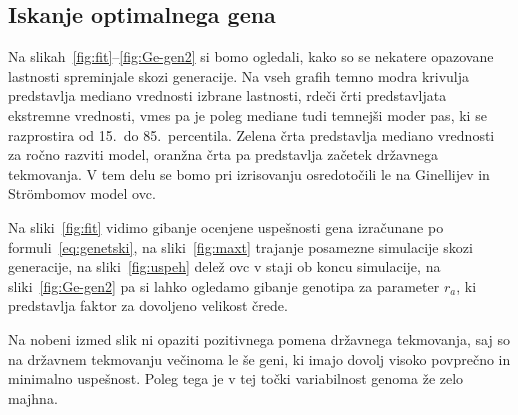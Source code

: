 \subsection{Iskanje optimalnega gena}

Na slikah~\ref{fig:fit}--\ref{fig:Ge-gen2} si bomo ogledali, kako so se nekatere opazovane lastnosti spreminjale skozi generacije. Na vseh grafih temno modra krivulja predstavlja mediano vrednosti izbrane lastnosti, rdeči črti predstavljata ekstremne vrednosti, vmes pa je poleg mediane tudi temnejši moder pas, ki se razprostira od 15.\ do 85.\ percentila. Zelena črta predstavlja mediano vrednosti za ročno razviti model, oranžna črta pa predstavlja začetek državnega tekmovanja. V tem delu se bomo pri izrisovanju osredotočili le na Ginellijev in Str{\"o}mbomov model ovc.

Na sliki~\ref{fig:fit} vidimo gibanje ocenjene uspešnosti gena izračunane po formuli~\eqref{eq:genetski}, na sliki~\ref{fig:maxt} trajanje posamezne simulacije skozi generacije, na sliki~\ref{fig:uspeh} delež ovc v staji ob koncu simulacije, na sliki~\ref{fig:Ge-gen2} pa si lahko ogledamo gibanje genotipa za parameter $r_a$, ki predstavlja faktor za dovoljeno velikost črede.

Na nobeni izmed slik ni opaziti pozitivnega pomena državnega tekmovanja, saj so na državnem tekmovanju večinoma le še geni, ki imajo dovolj visoko povprečno in minimalno uspešnost. Poleg tega je v tej točki variabilnost genoma že zelo majhna.

